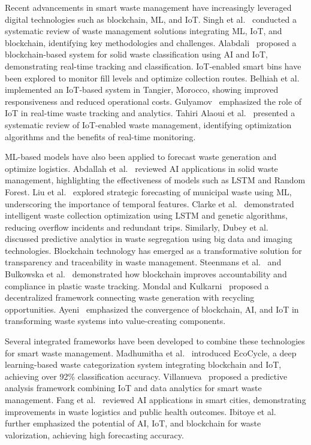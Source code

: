 \documentclass[final,5p,times,twocolumn]{elsarticle}
\begin{document}
Recent advancements in smart waste management have increasingly leveraged digital technologies such as blockchain, ML, and IoT. Singh et al.~\cite{singh2024} conducted a systematic review of waste management solutions integrating ML, IoT, and blockchain, identifying key methodologies and challenges. Alabdali~\cite{alabdali2025} proposed a blockchain-based system for solid waste classification using AI and IoT, demonstrating real-time tracking and classification. IoT-enabled smart bins have been explored to monitor fill levels and optimize collection routes. Belhiah et al.~\cite{belhiah2024optimising} implemented an IoT-based system in Tangier, Morocco, showing improved responsiveness and reduced operational costs. Gulyamov~\cite{gulyamov2024} emphasized the role of IoT in real-time waste tracking and analytics. Tahiri Alaoui et al.~\cite{alaoui2025} presented a systematic review of IoT-enabled waste management, identifying optimization algorithms and the benefits of real-time monitoring.

ML-based models have also been applied to forecast waste generation and optimize logistics. Abdallah et al.~\cite{abdallah2020artificial} reviewed AI applications in solid waste management, highlighting the effectiveness of models such as LSTM and Random Forest. Liu et al.~\cite{liu2025enhancing} explored strategic forecasting of municipal waste using ML, underscoring the importance of temporal features. Clarke et al.~\cite{clarke2025} demonstrated intelligent waste collection optimization using LSTM and genetic algorithms, reducing overflow incidents and redundant trips. Similarly, Dubey et al.~\cite{dubey2025} discussed predictive analytics in waste segregation using big data and imaging technologies. Blockchain technology has emerged as a transformative solution for transparency and traceability in waste management. Steenmans et al.~\cite{steenmans2021blockchain} and Bulkowska et al.~\cite{bulkowska2023implementation} demonstrated how blockchain improves accountability and compliance in plastic waste tracking. Mondal and Kulkarni~\cite{mondal2022blockchain} proposed a decentralized framework connecting waste generation with recycling opportunities. Ayeni~\cite{ayeni2025b} emphasized the convergence of blockchain, AI, and IoT in transforming waste systems into value-creating components.

Several integrated frameworks have been developed to combine these technologies for smart waste management. Madhumitha et al.~\cite{madhumitha2025} introduced EcoCycle, a deep learning-based waste categorization system integrating blockchain and IoT, achieving over 92\% classification accuracy. Villanueva~\cite{villanueva2024} proposed a predictive analysis framework combining IoT and data analytics for smart waste management. Fang et al.~\cite{fang2023} reviewed AI applications in smart cities, demonstrating improvements in waste logistics and public health outcomes. Ibitoye et al.~\cite{ibitoye2025} further emphasized the potential of AI, IoT, and blockchain for waste valorization, achieving high forecasting accuracy.
\end{document}
